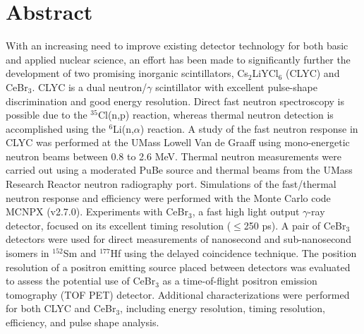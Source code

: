 \chapter*{Abstract}
\label{ch:abstract}


\hspace*{0.3cm}
\indent With an increasing need to improve existing detector technology for both basic and applied nuclear science, an effort has been made to significantly further the development of two promising inorganic scintillators, Cs$_2$LiYCl$_6$ (CLYC) and CeBr$_3$. CLYC is a dual neutron/$\gamma$ scintillator with excellent pulse-shape discrimination and good energy resolution. Direct fast neutron spectroscopy is possible due to the $^{35}$Cl(n,p) reaction, whereas thermal neutron detection is accomplished using the $^{6}$Li(n,$\alpha$) reaction. A study of the fast neutron response in CLYC was performed at the UMass Lowell Van de Graaff using mono-energetic neutron beams between 0.8 to 2.6 MeV. Thermal neutron measurements were carried out using a moderated PuBe source and thermal beams from the UMass Research Reactor neutron radiography port. Simulations of the fast/thermal neutron response and efficiency were performed with the Monte Carlo code MCNPX (v2.7.0). Experiments with CeBr$_3$, a fast high light output $\gamma$-ray detector, focused on its excellent timing resolution ($\le$250 ps). A pair of CeBr$_3$ detectors were used for direct measurements of nanosecond and sub-nanosecond isomers in $^{152}$Sm and $^{177}$Hf using the delayed coincidence technique. The position resolution of a positron emitting source placed between detectors was evaluated to assess the potential use of CeBr$_3$ as a time-of-flight positron emission tomography (TOF PET) detector. Additional characterizations were performed for both CLYC and CeBr$_3$, including energy resolution, timing resolution, efficiency, and pulse shape analysis. 




